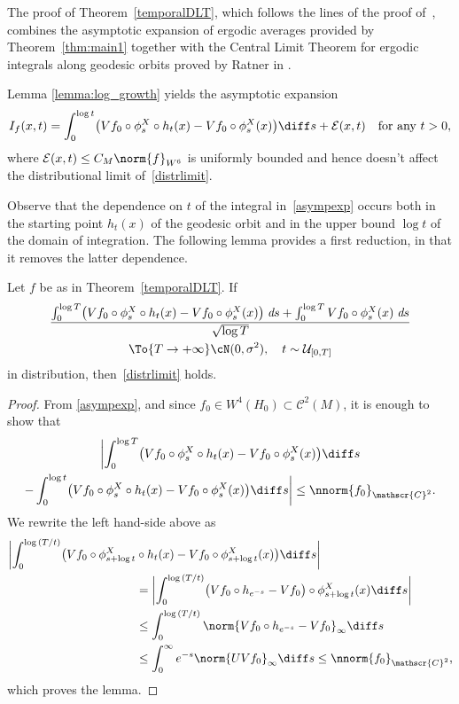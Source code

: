 \begin{appendix}
The proof of Theorem~\ref{temporalDLT}, which follows the lines of the proof of~\cite[Th.\,5.1]{Dolgopyat-Sarig}, combines the asymptotic expansion of ergodic averages provided by Theorem~\ref{thm:main1} together with the Central Limit Theorem for ergodic integrals along geodesic orbits proved by Ratner in \cite{Rat:CLT}.

Lemma \ref{lemma:log_growth} yields the asymptotic expansion
\begin{equation}
\label{asympexp}
I_f(x,t)=\int_0^{\log{t}}\bigl(Vf_0\circ \phi^{X}_s\circ h_t(x)-Vf_0\circ \phi_s^{X}(x) \bigr)\diff s +\mathcal{E}(x,t) \quad\text{for any }t>0,
\end{equation}
where $\mathcal{E}(x,t) \leq C_M\norm{f}_{W^6}$ is uniformly bounded and hence doesn't affect the distributional limit of~\eqref{distrlimit}.

Observe that the dependence on $t$ of the integral in~\eqref{asympexp} occurs both in the starting point $h_t(x)$ of the geodesic orbit and in the upper bound $\log{t}$ of the domain of integration. The following lemma provides a first reduction, in that it removes the latter dependence.

\begin{lemma}
Let $f$ be as in Theorem~\ref{temporalDLT}. If
\begin{multline*}
\frac{\int_0^{\log{T}}\bigl(Vf_0\circ \phi^{X}_s\circ h_t(x)-Vf_0\circ \phi_s^{X}(x) \bigr)\;\emph{d}s+\int_0^{\log{T}}Vf_0\circ\phi^{X}_s(x)\;\emph{d}s}{\sqrt{\log{T}}}\\
\To{T\to+\infty}\cN(0,\sigma^{2}), \quad
 t\sim \mathcal{U}_{[0,T]}
\end{multline*}
in distribution, then~\eqref{distrlimit} holds.
\end{lemma}
\begin{proof}
From \eqref{asympexp}, and since $f_0 \in W^4(H_0) \subset \mathscr{C}^2(M)$, it is enough to show that
\begin{multline*}
\biggl\lvert \int_0^{\log{T}}\bigl(Vf_0\circ \phi^{X}_s\circ h_t(x)-Vf_0\circ \phi_s^{X}(x) \bigr) \diff s \\
- \int_0^{\log{t}}\bigl(Vf_0\circ \phi^{X}_s\circ h_t(x)-Vf_0\circ \phi_s^{X}(x) \bigr) \diff s \biggr \rvert \leq \nnorm{f_0}_{\mathscr{C}^2}.
\end{multline*}
We rewrite the left hand-side above as
\begin{align*}
\biggl\lvert \int_0^{\log{(T/t)}}\bigl(Vf_0\circ \phi^{X}_{s+ \log t}&\circ h_t(x)-Vf_0\circ \phi_{s+\log t}^{X}(x) \bigr) \diff s \biggr\rvert\\
&= \biggl\lvert \int_0^{\log{(T/t)}}\bigl(Vf_0\circ h_{e^{-s}} - Vf_0 \bigr) \circ \phi^{X}_{s+ \log t}(x) \diff s \biggr\rvert\\
&\leq \int_0^{\log{(T/t)}} \norm{Vf_0\circ h_{e^{-s}} - Vf_0}_{\infty} \diff s \\
&\leq \int_0^{\infty} e^{-s} \norm{UVf_0}_{\infty} \diff s \leq \nnorm{f_0}_{\mathscr{C}^2},
\end{align*}
which proves the lemma.
\end{proof}


\end{appendix}
